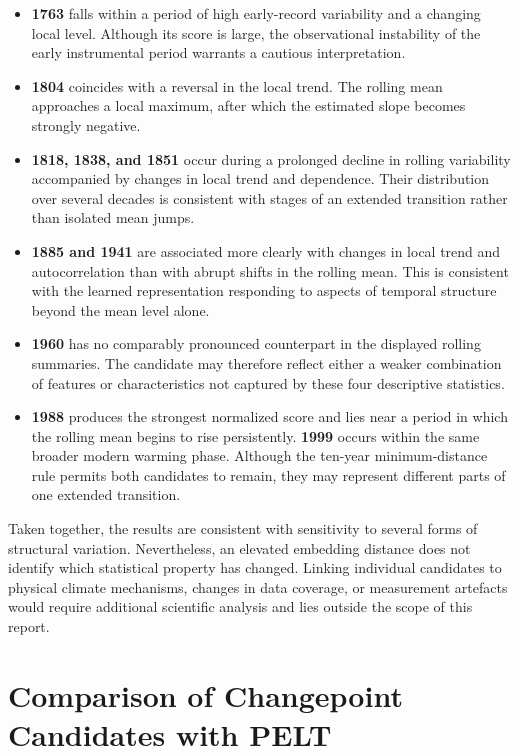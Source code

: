 \documentclass[
]{krantz}
\providecommand{\tightlist}{%
  \setlength{\itemsep}{0pt}\setlength{\parskip}{0pt}}
\begin{document}
\begin{itemize}
\tightlist
\item
  \textbf{1763} falls within a period of high early-record variability and a changing local level. Although its score is large, the observational instability of the early instrumental period warrants a cautious interpretation.
\item
  \textbf{1804} coincides with a reversal in the local trend. The rolling mean approaches a local maximum, after which the estimated slope becomes strongly negative.
\item
  \textbf{1818, 1838, and 1851} occur during a prolonged decline in rolling variability accompanied by changes in local trend and dependence. Their distribution over several decades is consistent with stages of an extended transition rather than isolated mean jumps.
\item
  \textbf{1885 and 1941} are associated more clearly with changes in local trend and autocorrelation than with abrupt shifts in the rolling mean. This is consistent with the learned representation responding to aspects of temporal structure beyond the mean level alone.
\item
  \textbf{1960} has no comparably pronounced counterpart in the displayed rolling summaries. The candidate may therefore reflect either a weaker combination of features or characteristics not captured by these four descriptive statistics.
\item
  \textbf{1988} produces the strongest normalized score and lies near a period in which the rolling mean begins to rise persistently. \textbf{1999} occurs within the same broader modern warming phase. Although the ten-year minimum-distance rule permits both candidates to remain, they may represent different parts of one extended transition.
\end{itemize}

Taken together, the results are consistent with sensitivity to several forms of structural variation. Nevertheless, an elevated embedding distance does not identify which statistical property has changed. Linking individual candidates to physical climate mechanisms, changes in data coverage, or measurement artefacts would require additional scientific analysis and lies outside the scope of this report.

\section{Comparison of Changepoint Candidates with PELT}\label{comparison-of-changepoint-candidates-with-pelt}
\end{document}
